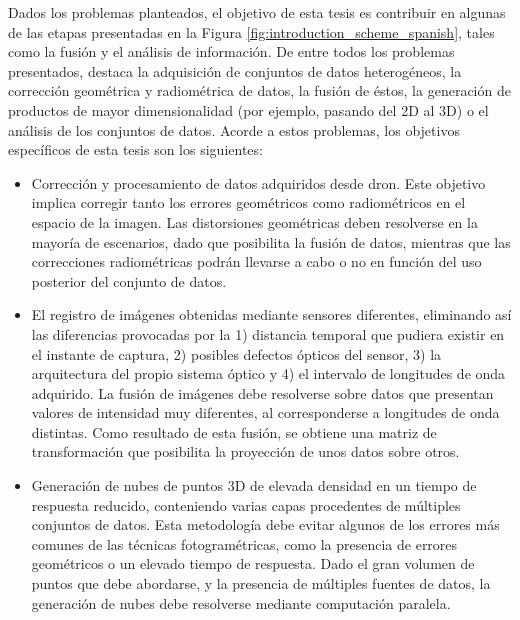 Dados los problemas planteados, el objetivo de esta tesis es contribuir en algunas de las etapas presentadas en la Figura \ref{fig:introduction_scheme_spanish}, tales como la fusión y el análisis de información. De entre todos los problemas presentados, destaca la adquisición de conjuntos de datos heterogéneos, la corrección geométrica y radiométrica de datos, la fusión de éstos, la generación de productos de mayor dimensionalidad (por ejemplo, pasando del 2D al 3D) o el análisis de los conjuntos de datos. Acorde a estos problemas, los objetivos específicos de esta tesis son los siguientes:
\begin{itemize}
    \item Corrección y procesamiento de datos adquiridos desde dron. Este objetivo implica corregir tanto los errores geométricos como radiométricos en el espacio de la imagen. Las distorsiones geométricas deben resolverse en la mayoría de escenarios, dado que posibilita la fusión de datos, mientras que las correcciones radiométricas podrán llevarse a cabo o no en función del uso posterior del conjunto de datos. 
    \item El registro de imágenes obtenidas mediante sensores diferentes, eliminando así las diferencias provocadas por la 1) distancia temporal que pudiera existir en el instante de captura, 2) posibles defectos ópticos del sensor, 3) la arquitectura del propio sistema óptico y 4) el intervalo de longitudes de onda adquirido. La fusión de imágenes debe resolverse sobre datos que presentan valores de intensidad muy diferentes, al corresponderse a longitudes de onda distintas. Como resultado de esta fusión, se obtiene una matriz de transformación que posibilita la proyección de unos datos sobre otros.
    \item Generación de nubes de puntos 3D de elevada densidad en un tiempo de respuesta reducido, conteniendo varias capas procedentes de múltiples conjuntos de datos. Esta metodología debe evitar algunos de los errores más comunes de las técnicas fotogramétricas, como la presencia de errores geométricos o un elevado tiempo de respuesta. Dado el gran volumen de puntos que debe abordarse, y la presencia de múltiples fuentes de datos, la generación de nubes debe resolverse mediante computación paralela.

\end{itemize}
